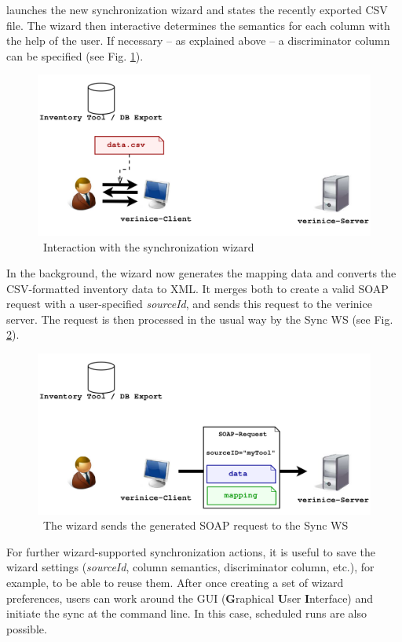 \documentclass[a4paper,10pt]{book}
\begin{document}
launches the new synchronization wizard and states the recently exported CSV file. The wizard then
interactive determines the semantics for each column with the help of the user. If necessary – as
explained above – a discriminator column can be specified (see Fig. \ref{Interaction with the synchronization wizard}).
\newline
\begin{figure}[htb!]
  \centering
  \includegraphics[scale=.28]{Screenshot/Use_case_verinice_wizard_02_03-en.png}
  \caption{\label{Interaction with the synchronization wizard} \ Interaction with the synchronization wizard}
\end{figure}
\newline
In the background, the wizard now generates the mapping data and
converts the CSV-formatted inventory data to XML. It merges both to
create a valid SOAP request with a user-specified {\em sourceId}, and
sends this request to the verinice server. The request is then
processed in the usual way by the Sync WS (see
Fig. \ref{fig:soap-request}).
\newline
\begin{figure}[htb!]
  \centering
  \includegraphics[scale=.28]{Screenshot/Use_case_verinice_wizard_03_03-en.png}
  \caption{\label{fig:soap-request} \ The wizard sends the generated SOAP request to the Sync WS}
\end{figure}
\newline
For further wizard-supported synchronization actions, it is useful to save the wizard settings ({\em sourceId},
column semantics, discriminator column, etc.), for example, to be able to reuse them. After once creating a set
of wizard preferences, users can work around the GUI (\textbf{G}raphical \textbf{U}ser \textbf{I}nterface) and
initiate the sync at the command line. In this case, scheduled runs are also possible.
\end{document}
